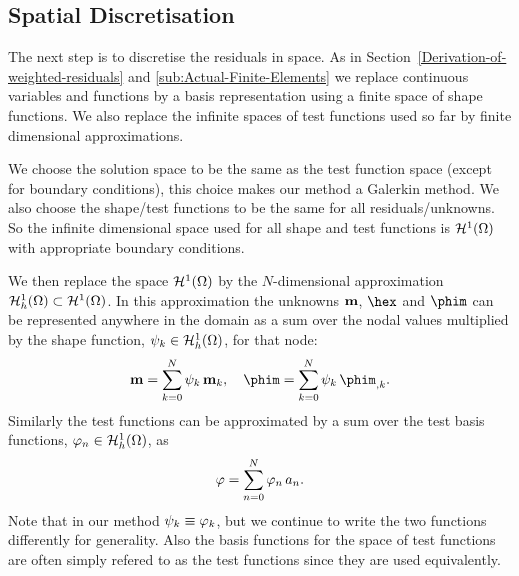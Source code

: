\subsection{Spatial Discretisation}
\label{sec:spat-discr-resi}

The next step is to discretise the residuals in space. As in Section~\ref{Derivation-of-weighted-residuals} and \ref{sub:Actual-Finite-Elements} we replace continuous variables and functions by a basis representation using a finite space of shape functions. We also replace the infinite spaces of test functions used so far by finite dimensional approximations.

We choose the solution space to be the same as the test function space (except for boundary conditions), this choice makes our method a Galerkin method. We also choose the shape/test functions to be the same for all residuals/unknowns. So the infinite dimensional space used for all shape and test functions is $\mathcal{H}^1(\Omega)$ with appropriate boundary conditions.

We then replace the space $\mathcal{H}^1(\Omega)$ by the $N$-dimensional approximation ${\mathcal{H}^1_h(\Omega)} \subset \mathcal{H}^1(\Omega)$. In this approximation the unknowns $\mathbf{m}$, $\hex$ and $\phim$ can be represented anywhere in the domain as a sum over the nodal values multiplied by the shape function, ${\psi_k} \in {\mathcal{H}^1_h(\Omega)}$, for that node:
\begin{gather} %
  \mv = \sum_{k = 0}^{N} \sk \, \mv_k, \quad
  \phim = \sum_{k = 0}^{N} \sk \, \phim_{,k}.
  \label{eq:unknowns-basis}
\end{gather}
Similarly the test functions can be approximated by a sum over the test basis functions, ${\varphi_n} \in {\mathcal{H}^1_h(\Omega)}$, as
\begin{equation}
  \label{eq:47}
  \varphi = \sum_{n = 0}^{N} {\varphi_n} \, a_n.
\end{equation}
Note that in our method $\psi_k \equiv \varphi_k$, but we continue to write the two functions differently for generality. Also the basis functions for the space of test functions are often simply refered to as the test functions since they are used equivalently.


